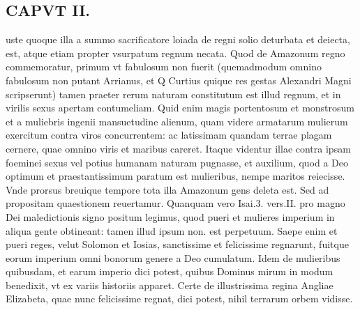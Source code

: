 \documentclass{article}
\begin{document}
\begin{pages}
\section*{CAPVT II. }
\marginpar{[ p.85. ]}\pstart uste quoque illa a summo sacrificatore loiada de regni solio deturbata et deiecta, est, atque etiam propter vsurpatum regnum necata. Quod de Amazonum regno commemoratur, primum vt fabulosum non fuerit (quemadmodum omnino fabulosum non putant Arrianus, et Q Curtius quique res gestas Alexandri Magni scripserunt) tamen praeter rerum naturam constitutum est illud regnum, et in virilis sexus apertam contumeliam. Quid enim magis portentosum et monstrosum et a muliebris ingenii mansuetudine alienum, quam videre armatarum mulierum exercitum contra viros concurrentem: ac latissimam quandam terrae plagam cernere, quae omnino viris et maribus careret. Itaque videntur illae contra ipsam foeminei sexus vel potius humanam naturam pugnasse, et auxilium, quod a Deo optimum et praestantissimum paratum est mulieribus, nempe maritos reiecisse. Vnde prorsus breuique  tempore tota illa Amazonum gens deleta est. Sed ad propositam quaestionem reuertamur. Quanquam vero Isai.3. vers.II. pro magno Dei maledictionis signo positum legimus, quod pueri et mulieres imperium in aliqua gente obtineant: tamen illud ipsum non. est perpetuum. Saepe enim et pueri reges, velut Solomon et Iosias, sanctissime et felicissime regnarunt, fuitque eorum imperium omni bonorum genere a Deo cumulatum. Idem de mulieribus quibusdam, et earum imperio dici potest, quibus Dominus mirum in modum benedixit, vt ex variis historiis apparet. Certe de illustrissima regina Angliae Elizabeta, quae nunc felicissime regnat, dici potest, nihil terrarum orbem vidisse.  \pend

\end{pages}
\end{document}
